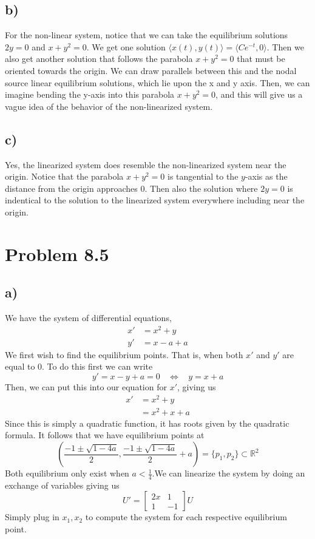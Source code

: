 \documentclass{article}
\theoremstyle{definition}
\begin{document}
\subsection*{b)}
For the non-linear system, notice that we can take the equilibrium solutions
$2y = 0$ and $x + y^2 = 0$. We get one solution $\langle x(t), y(t) \rangle = \langle Ce^{-t}, 0\rangle$.
Then we also get another solution that follows the parabola $x + y^2 = 0$ that must 
be oriented towards the origin. We can draw parallels between this and the nodal source 
linear equilibrium solutions, which lie upon the x and y axis. Then,
we can imagine bending the y-axis into this parabola $x + y^2 = 0$, and this will
give us a vague idea of the behavior of the non-linearized system.
\subsection*{c)}
Yes, the linearized system does resemble the non-linearized system near the origin.
Notice that the parabola $x + y^2 = 0$ is tangential to the $y$-axis as the distance from
the origin approaches 0. Then also the solution where $2y = 0$ is indentical to the 
solution to the linearized system everywhere including near the origin.
\section*{Problem 8.5}
\subsection*{a)}
We have the system of differential equations,
\begin{align*}
    x'&=x^2+y\\y'&=x-a+a
\end{align*}
We first wish to find the equilibrium points. That is, when both $x'$ and $y'$ are equal to 0.
To do this first we can write 
\[
    y' = x-y+a = 0\ \ \ \ \Longleftrightarrow \ \ \ \ y = x + a
\]
Then, we can put this into our equation for $x'$, giving us 
\begin{align*}
    x' &= x^2 + y\\
    &=x^2 + x + a
\end{align*}
Since this is simply a quadratic function, it has roots given by the quadratic formula. It 
follows that we have equilibrium points at 
\[
    \left(\frac{-1 \pm \sqrt{1-4a}}{2}, \frac{-1 \pm \sqrt{1-4a}}{2} + a\right) = \{p_1,p_2\} \subset \mathbb{R}^2
\]
Both equilibrium only exist when $a < \frac{1}{4}$.We can linearize the system by doing an exchange of variables giving us 
\[
    U' = \begin{bmatrix}
        2x&1\\1&-1
    \end{bmatrix}U
\]
Simply plug in $x_1, x_2$ to compute the system for each respective equilibrium point.
\end{document}
